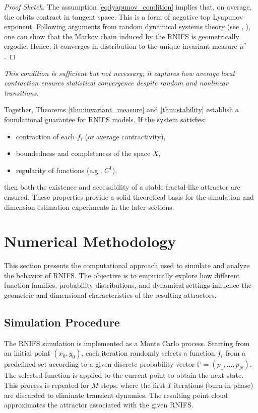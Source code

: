 \documentclass[twocolumn,10pt]{article}
\begin{document}
\begin{proof}[Proof Sketch]
The assumption \eqref{eq:lyapunov_condition} implies that, on average, the orbits contract in tangent space. This is a form of negative top Lyapunov exponent. Following arguments from random dynamical systems theory (see \parencite{walters1989yuri}, \parencite{arnold1997unfolding}), one can show that the Markov chain induced by the RNIFS is geometrically ergodic. Hence, it converges in distribution to the unique invariant measure $\mu^*$.
\end{proof}

\textit{This condition is sufficient but not necessary; it captures how average local contraction ensures statistical convergence despite random and nonlinear transitions.}


Together, Theorems \ref{thm:invariant_measure} and \ref{thm:stability} establish a foundational guarantee for RNIFS models. If the system satisfies:
\begin{itemize}
  \item contraction of each $f_i$ (or average contractivity),
  \item boundedness and completeness of the space $X$,
  \item regularity of functions (e.g., $C^1$),
\end{itemize}
then both the existence and accessibility of a stable fractal-like attractor are ensured. These properties provide a solid theoretical basis for the simulation and dimension estimation experiments in the later sections.

\section{Numerical Methodology}
\label{sec:methodology}
\vspace{0.8em}
This section presents the computational approach used to simulate and analyze the behavior of RNIFS. The objective is to empirically explore how different function families, probability distributions, and dynamical settings influence the geometric and dimensional characteristics of the resulting attractors.

\subsection{Simulation Procedure}
\label{subsec:algorithm}

The RNIFS simulation is implemented as a Monte Carlo process. Starting from an initial point $(x_0, y_0)$, each iteration randomly selects a function $f_i$ from a predefined set according to a given discrete probability vector $\mathbb{P} = (p_1, \dots, p_N)$. The selected function is applied to the current point to obtain the next state. This process is repeated for $M$ steps, where the first $T$ iterations (burn-in phase) are discarded to eliminate transient dynamics. The resulting point cloud approximates the attractor associated with the given RNIFS.
\end{document}

